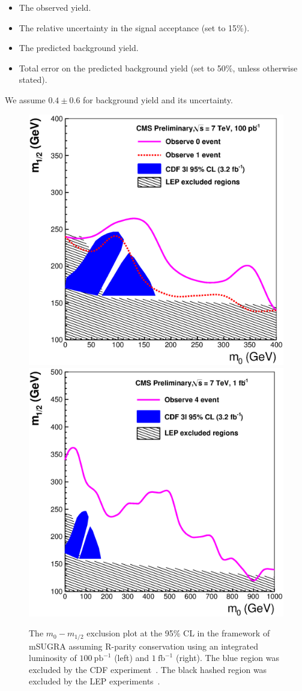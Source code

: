 \begin{itemize}
\item The observed yield.
\item The relative  uncertainty in  the  signal acceptance (set  to 15\%).
\item The predicted  background yield.
\item Total  error  on the  predicted background yield (set to 50\%, unless otherwise stated).
\end{itemize}
We assume $0.4 \pm 0.6$ for background yield and its uncertainty.
\vspace{3 mm}
\begin{figure}[htb]
\begin{center}

\includegraphics[width=0.485\linewidth]{figs/exclusion100ss.eps}
\includegraphics[width=0.485\linewidth]{figs/exclusion1fbss.eps}
\caption{The $m_{0}-m_{1/2}$ exclusion plot at the 95\% CL in the framework of 
mSUGRA assuming R-parity conservation using an  integrated  luminosity of  
$100~\mathrm{pb}^{-1}$ (left) and $1~\mathrm{fb}^{-1}$ (right). The blue region
was excluded by the CDF experiment~\cite{cdf:recentSusy}. The black hashed region was excluded
by the LEP experiments~\cite{lep:lepsusyreach}.\label{fig:ss_exclusion}}

\end{center}
\end{figure}

